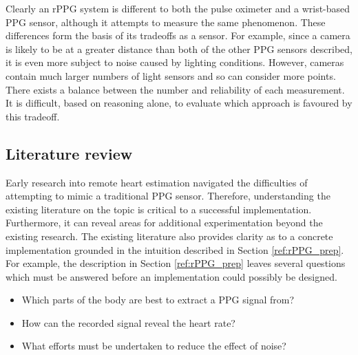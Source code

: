 Clearly an rPPG system is different to both the pulse oximeter and a wrist-based PPG sensor, although it attempts to measure the same phenomenon.
These differences form the basis of its tradeoffs as a sensor. For example, since a camera is likely to be at a greater distance than both of the other PPG sensors described, it is even more
subject to noise caused by lighting conditions. However, cameras contain much larger numbers of light sensors and so can consider more points. There exists a balance between the number and 
reliability of each measurement. It is difficult, based on reasoning alone, to evaluate which approach is favoured by this tradeoff. 

\subsection{Literature review}
\label{ref:literature_review}
Early research into remote heart estimation navigated the difficulties of attempting to mimic a traditional PPG sensor.
Therefore, understanding the existing literature on the topic is critical to a successful implementation. Furthermore, it can reveal areas for additional experimentation beyond the existing 
research.
The existing literature also provides clarity as to a concrete implementation grounded in the intuition described in Section \ref{ref:rPPG_prep}.
For example, the description in Section \ref{ref:rPPG_prep} leaves several questions which must be answered before an implementation could possibly be designed.
\begin{itemize}
    \item Which parts of the body are best to extract a PPG signal from?
    \item How can the recorded signal reveal the heart rate?
    \item What efforts must be undertaken to reduce the effect of noise?
\end{itemize}
